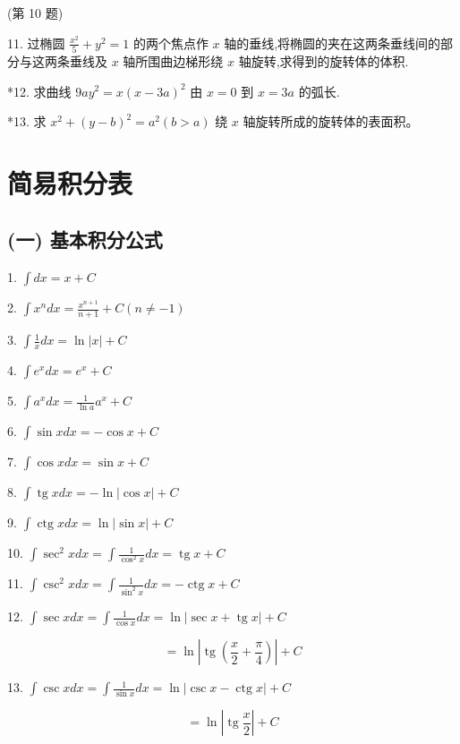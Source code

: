 \documentclass[lang=cn,newtx,12pt,scheme=chinese]{elegantbook}
\begin{document}
(第 10 题)

11. 过椭圆 \(\frac{{x}^{2}}{5} + {y}^{2} = 1\) 的两个焦点作 \(x\) 轴的垂线,将椭圆的夹在这两条垂线间的部分与这两条垂线及 \(x\) 轴所围曲边梯形绕 \(x\) 轴旋转,求得到的旋转体的体积.

*12. 求曲线 \({9a}{y}^{2} = x{\left( x - 3a\right) }^{2}\) 由 \(x = 0\) 到 \(x = {3a}\) 的弧长.

*13. 求 \({x}^{2} + {\left( y - b\right) }^{2} = {a}^{2}\left( {b > a}\right)\) 绕 \(x\) 轴旋转所成的旋转体的表面积。


\appendix

\chapter{简易积分表}

\section*{(一) 基本积分公式}

1. \(\int {dx} = x + C\)

2. \(\int {x}^{n}{dx} = \frac{{x}^{n + 1}}{n + 1} + C\left( {n \neq - 1}\right)\)

3. \(\int \frac{1}{x}{dx} = \ln \left| x\right| + C\)

4. \(\int {e}^{x}{dx} = {e}^{x} + C\)

5. \(\int {a}^{x}{dx} = \frac{1}{\ln a}{a}^{x} + C\)

6. \(\int \sin {xdx} = - \cos x + C\)

7. \(\int \cos {xdx} = \sin x + C\)

8. \(\int \operatorname{tg}{xdx} = - \ln \left| {\cos x}\right| + C\)

9. \(\int \operatorname{ctg}{xdx} = \ln \left| {\sin x}\right| + C\)

10. \(\int {\sec }^{2}{xdx} = \int \frac{1}{{\cos }^{2}x}{dx} = \operatorname{tg}x + C\)

11. \(\int {\csc }^{2}{xdx} = \int \frac{1}{{\sin }^{2}x}{dx} = - \operatorname{ctg}x + C\)

12. \(\int \sec {xdx} = \int \frac{1}{\cos x}{dx} = \ln \left| {\sec x + \operatorname{tg}x}\right| + C\)

\[
= \ln \left| {\operatorname{tg}\left( {\frac{x}{2} + \frac{\pi }{4}}\right) }\right| + C
\]

13. \(\int \csc {xdx} = \int \frac{1}{\sin x}{dx} = \ln \left| {\csc x - \operatorname{ctg}x}\right| + C\)

\[
= \ln \left| {\operatorname{tg}\frac{x}{2}}\right| + C
\]
\end{document}
